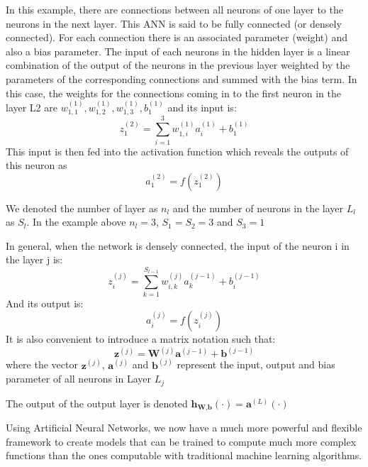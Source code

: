\documentclass{article}
\begin{document}
In this example, there are connections between all neurons of one layer to the neurons in the next layer. This ANN is said to be fully connected (or densely connected). For each connection there is an associated parameter (weight) and also a bias parameter. The input of each neurons in the hidden layer is a linear combination of the output of the neurons in the previous layer weighted by the parameters of the corresponding connections and summed with the bias term. In this case, the weights for the connections coming in to the first neuron in the layer L2 are $w_{1,1}^{(1)},w_{1,2}^{(1)},w_{1,3}^{(1)}, b_1^{( 1 )}$ and its input is:
\begin{equation}
z_1^{(2)} = \sum_{i=1}^3 w_{1,i}^{(1)} a_i^{(1)} + b_1^{(1)}
\end{equation}
This input is then fed into the activation function which reveals the outputs of this neuron as 
\begin{equation}
a_1^{( 2 )} = f\left( z_1^{(2)} \right)
\end{equation}

We denoted the number of layer as $n_l$ and the number of neurons in the layer $L_l$ as $S_l$. In the example above $n_l=3$, $S_1 = S_2 = 3$ and $S_3 = 1$

In general, when the network is densely connected, the input of the neuron i in the layer j is:
\begin{equation}
z_i^{(j)} = \sum_{k=1}^{S_{l-1}} w_{i,k}^{(j)} a_k^{(j-1)} + b_i^{(j-1)}  
\end{equation}
And its output is:
\begin{equation}
a_i^{(j)} = f(z_i^{(j)})
\end{equation}
It is also convenient to introduce a matrix notation such that:
\begin{equation}
\textbf{z}^{(j)} = \textbf{W}^{(j)} \textbf{a}^{(j-1)} + \textbf{b}^{(j-1)}
\end{equation}
where the vector $\textbf{z}^{(j)}$, $\textbf{a}^{(j)}$ and $\textbf{b}^{(j)}$ represent the input, output and bias parameter of all neurons in Layer $L_j$

The output of the output layer is denoted $\textbf{h}_{\textbf{W},\textbf{b}}\left( \cdot \right) = \textbf{a}^{(L)}\left( \cdot \right)$


Using Artificial Neural Networks, we now have a much more powerful and flexible framework to create models that can be trained to compute much more complex functions than the ones computable with traditional machine learning algorithms.
\end{document}
